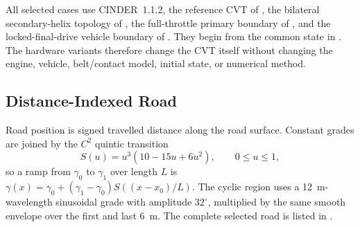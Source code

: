 \documentclass[11pt]{report}
\numberwithin{equation}{section}
\begin{document}
All selected cases use CINDER~1.1.2, the reference CVT of
, the bilateral secondary-helix
topology of , the full-throttle primary
boundary of , and the locked-final-drive
vehicle boundary of . They begin from the
common state in . The hardware
variants therefore change the CVT itself without changing the engine, vehicle,
belt/contact model, initial state, or numerical method.

\subsection{Distance-Indexed Road}
\label{app:course_profile}

Road position is signed travelled distance along the road surface. Constant
grades are joined by the \(C^2\) quintic transition
\begin{equation}
S(u)=u^3\left(10-15u+6u^2\right),
\qquad 0\le u\le1,
\label{eq:course_smoothstep}
\end{equation}
so a ramp from \(\gamma_0\) to \(\gamma_1\) over length \(L\) is
\(\gamma(x)=\gamma_0+(\gamma_1-\gamma_0)S((x-x_0)/L)\).
The cyclic region uses a \SI{12}{m}-wavelength sinusoidal grade with amplitude
\(32^\circ\), multiplied by the same smooth envelope over the first and last
\SI{6}{m}. The complete selected road is listed in
.
\end{document}
